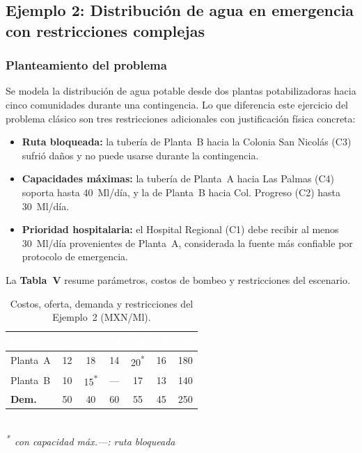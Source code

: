 \documentclass[10pt,letterpaper,twocolumn]{article}
\begin{document}
\subsection{Ejemplo 2: Distribución de agua en emergencia con restricciones complejas}

\subsubsection{Planteamiento del problema}
Se modela la distribución de agua potable desde dos plantas potabilizadoras hacia cinco comunidades durante una contingencia. Lo que diferencia este ejercicio del problema clásico son tres restricciones adicionales con justificación física concreta:

\begin{itemize}
\item \textbf{Ruta bloqueada:} la tubería de Planta~B hacia la Colonia San Nicolás (C3) sufrió daños y no puede usarse durante la contingencia.
\item \textbf{Capacidades máximas:} la tubería de Planta~A hacia Las Palmas (C4) soporta hasta 40~Ml/día, y la de Planta~B hacia Col. Progreso (C2) hasta 30~Ml/día.
\item \textbf{Prioridad hospitalaria:} el Hospital Regional (C1) debe recibir al menos 30~Ml/día provenientes de Planta~A, considerada la fuente más confiable por protocolo de emergencia.
\end{itemize}

La \textbf{Tabla~V} resume parámetros, costos de bombeo y restricciones del escenario.

\begin{table}[!h]
\caption{Costos, oferta, demanda y restricciones del Ejemplo~2 (MXN/Ml).}
\centering
\fontsize{7.5pt}{9pt}\selectfont
\begin{tabular}{l c c c c c c}
\arrayrulecolor{infotec}\toprule
\rowcolor{infotec}\textcolor{white}{\textbf{Origen}} & \textcolor{white}{\textbf{C1}} & \textcolor{white}{\textbf{C2}} & \textcolor{white}{\textbf{C3}} & \textcolor{white}{\textbf{C4}} & \textcolor{white}{\textbf{C5}} & \textcolor{white}{\textbf{Of.}} \\
\midrule
Planta~A & 12 & 18 & 14 & 20\textsuperscript{*} & 16 & 180 \\
Planta~B & 10 & 15\textsuperscript{*} & --- & 17 & 13 & 140 \\
\midrule
\textbf{Dem.} & 50 & 40 & 60 & 55 & 45 & 250 \\
\bottomrule
\end{tabular}
\\[0.04in]
\fontsize{7pt}{8pt}\selectfont \emph{\textsuperscript{*}~con capacidad máx.\quad ---: ruta bloqueada}
\end{table}
\end{document}
